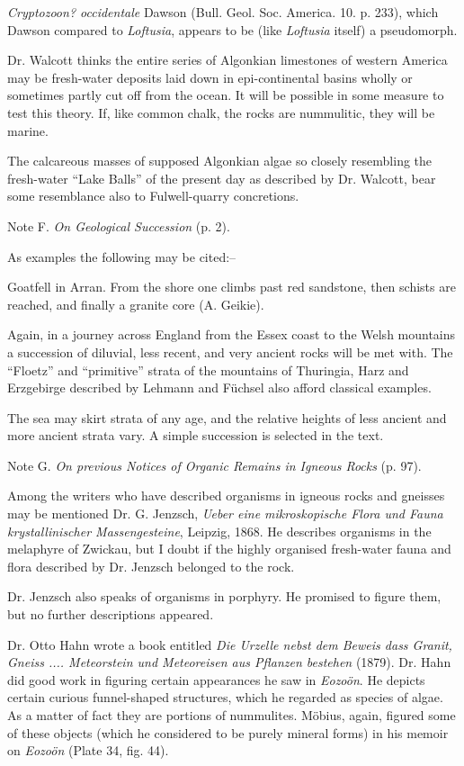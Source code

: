 \documentclass[a4paper, 12pt, oneside]{article}
\begin{document}
\emph{Cryptozoon? occidentale} Dawson (Bull. Geol. Soc. America. 10. p. 233), which Dawson compared to \emph{Loftusia}, appears to be (like \emph{Loftusia} itself) a pseudomorph.

Dr. Walcott thinks the entire series of Algonkian limestones of western America may be fresh-water deposits laid down in epi-continental basins wholly or sometimes partly cut off from the ocean. It will be possible in some measure to test this theory. If, like common chalk, the rocks are nummulitic, they will be marine.

The calcareous masses of supposed Algonkian algae so closely resembling the fresh-water ``Lake Balls'' of the present day as described by Dr. Walcott, bear some resemblance also to Fulwell-quarry concretions.

Note F. \emph{On Geological Succession} (p. 2).

As examples the following may be cited:--

Goatfell in Arran. From the shore one climbs past red sandstone, then schists are reached, and finally a granite core (A. Geikie).

Again, in a journey across England from the Essex coast to the Welsh mountains a succession of diluvial, less recent, and very ancient rocks will be met with. The ``Floetz'' and ``primitive'' strata of the mountains of Thuringia, Harz and Erzgebirge described by Lehmann and Füchsel also afford classical examples.

The sea may skirt strata of any age, and the relative heights of less ancient and more ancient strata vary. A simple succession is selected in the text.

Note G. \emph{On previous Notices of Organic Remains in Igneous Rocks} (p. 97).

Among the writers who have described organisms in igneous rocks and gneisses may be mentioned Dr. G. Jenzsch, \emph{Ueber eine mikroskopische Flora und Fauna krystallinischer Massengesteine}, Leipzig, 1868. He describes organisms in the melaphyre of Zwickau, but I doubt if the highly organised fresh-water fauna and flora described by Dr. Jenzsch belonged to the rock.

Dr. Jenzsch also speaks of organisms in porphyry. He promised to figure them, but no further descriptions appeared.

Dr. Otto Hahn wrote a book entitled \emph{Die Urzelle nebst dem Beweis dass Granit, Gneiss .... Meteorstein und Meteoreisen aus Pflanzen bestehen} (1879). Dr. Hahn did good work in figuring certain appearances he saw in \emph{Eozoön}. He depicts certain curious funnel-shaped structures, which he regarded as species of algae. As a matter of fact they are portions of nummulites. Möbius, again, figured some of these objects (which he considered to be purely mineral forms) in his memoir on \emph{Eozoön} (Plate 34, fig. 44).
\end{document}
